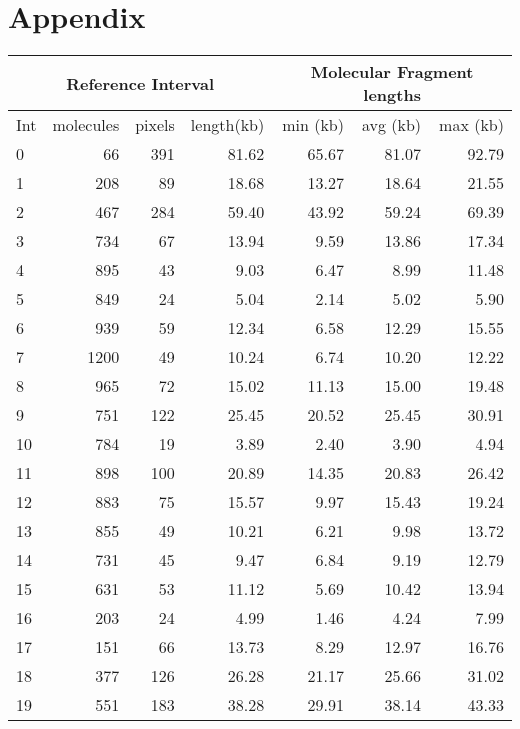 \section{Appendix}

\begin{table}[t]
\centering
\begin{tabular}{lrrr|rrr}
  \hline
  \hline
  \multicolumn{4}{c}{Reference Interval} & \multicolumn{3}{c}{Molecular Fragment lengths} \\
  \hline
   Int  & molecules & pixels & length(kb) & min (kb) & avg (kb) & max (kb)\\ 
  \hline
  \hline
    0 &  66 & 391 & 81.62 & 65.67 & 81.07 & 92.79 \\ 
    1 & 208 & 89 & 18.68 & 13.27 & 18.64 & 21.55 \\ 
    2 & 467 & 284 & 59.40 & 43.92 & 59.24 & 69.39 \\ 
    3 & 734 & 67 & 13.94 & 9.59 & 13.86 & 17.34 \\ 
    4 & 895 & 43 & 9.03 & 6.47 & 8.99 & 11.48 \\ 
    5 & 849 & 24 & 5.04 & 2.14 & 5.02 & 5.90 \\ 
    6 & 939 & 59 & 12.34 & 6.58 & 12.29 & 15.55 \\ 
    7 & 1200 & 49 & 10.24 & 6.74 & 10.20 & 12.22 \\ 
    8 & 965 & 72 & 15.02 & 11.13 & 15.00 & 19.48 \\ 
    9 & 751 & 122 & 25.45 & 20.52 & 25.45 & 30.91 \\ 
   10 & 784 & 19 & 3.89 & 2.40 & 3.90 & 4.94 \\ 
   11 & 898 & 100 & 20.89 & 14.35 & 20.83 & 26.42 \\ 
   12 & 883 & 75 & 15.57 & 9.97 & 15.43 & 19.24 \\ 
   13 & 855 & 49 & 10.21 & 6.21 & 9.98 & 13.72 \\ 
   14 & 731 & 45 & 9.47 & 6.84 & 9.19 & 12.79 \\ 
   15 & 631 & 53 & 11.12 & 5.69 & 10.42 & 13.94 \\ 
   16 & 203 & 24 & 4.99 & 1.46 & 4.24 & 7.99 \\ 
   17 & 151 & 66 & 13.73 & 8.29 & 12.97 & 16.76 \\ 
   18 & 377 & 126 & 26.28 & 21.17 & 25.66 & 31.02 \\ 
   19 & 551 & 183 & 38.28 & 29.91 & 38.14 & 43.33 \\ 

\end{tabular}
\end{table}
